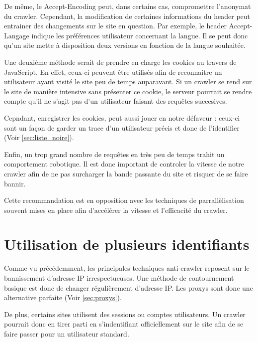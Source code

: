 \documentclass[hideweeklyreports,noposter]{polytech/polytech}
\begin{document}
            De même, le Accept-Encoding peut, dans certains cas, compromettre l'anonymat du crawler.
            Cependant, la modification de certaines informations du header peut entrainer des changements sur le site en question.
            Par exemple, le header Accept-Langage indique les préférences utilisateur concernant la langue. 
            Il se peut donc qu'un site mette à disposition deux versions en fonction de la langue souhaitée.
            
            
            Une deuxième méthode serait de prendre en charge les cookies au travers de JavaScript.
            En effet, ceux-ci peuvent être utilisés afin de reconnaitre un utilisateur ayant visité le site peu de temps auparavant.
            Si un crawler se rend sur le site de manière intensive sans présenter ce cookie, le serveur pourrait se rendre compte qu'il ne s'agit pas d'un utilisateur faisant des requêtes succesives.
            
            Cepndant, enregistrer les cookies, peut aussi jouer en notre défaveur : ceux-ci sont un façon de garder un trace d'un utilisateur précis et donc de l'identifier (Voir \autoref{sec:liste_noire}).
            
            
            Enfin, un trop grand nombre de requêtes en très peu de temps trahit un comportement robotique.
            Il est donc important de controler la vitesse de notre crawler afin de ne pas surcharger la bande passante du site et risquer de se faire bannir.
            
            Cette recommandation est en opposition avec les techniques de parrallèlisation souvent mises en place afin d'accélérer la vitesse et l'efficacité du crawler.
            
		
		\section{Utilisation de plusieurs identifiants}
			Comme vu précédemment, les principales techniques anti-crawler reposent sur le bannissement d'adresse IP irrespectueuses.
			Une méthode de contournement basique est donc de changer régulièrement d'adresse IP.
			Les proxys sont donc une alternative parfaite (Voir \autoref{sec:proxys}).



			De plus, certains sites utilisent des sessions ou comptes utilisateurs.
			Un crawler pourrait donc en tirer parti en s'indentifiant officiellement sur le site afin de se faire passer pour un utilisateur standard.
\end{document}
